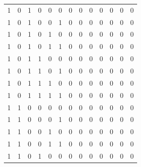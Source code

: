 \documentclass[12pt, letterpaper]{article}
\begin{document}
\begin{table}[H]
\begin{center}
\begin{tabular}{|ccc|ccc|ccc|cccc|}
    \hline
    1 & 0 & 1 & 0 & 0 & 0 & 0 & 0 & 0 & \cellcolor{ForestGreen!90}0 & \cellcolor{ForestGreen!90}0 & \cellcolor{ForestGreen!90}0 & \cellcolor{ForestGreen!90}0 \\
    1 & 0 & 1 & 0 & 0 & 1 & 0 & 0 & 0 & \cellcolor{ForestGreen!90}0 & \cellcolor{ForestGreen!90}0 & \cellcolor{ForestGreen!90}0 & \cellcolor{ForestGreen!90}0 \\
    1 & 0 & 1 & 0 & 1 & 0 & 0 & 0 & 0 & \cellcolor{ForestGreen!90}0 & \cellcolor{ForestGreen!90}0 & \cellcolor{ForestGreen!90}0 & \cellcolor{ForestGreen!90}0 \\
    1 & 0 & 1 & 0 & 1 & 1 & 0 & 0 & 0 & \cellcolor{ForestGreen!90}0 & \cellcolor{ForestGreen!90}0 & \cellcolor{ForestGreen!90}0 & \cellcolor{ForestGreen!90}0 \\
    1 & 0 & 1 & 1 & 0 & 0 & 0 & 0 & 0 & \cellcolor{ForestGreen!90}0 & \cellcolor{ForestGreen!90}0 & \cellcolor{ForestGreen!90}0 & \cellcolor{ForestGreen!90}0 \\
    1 & 0 & 1 & 1 & 0 & 1 & 0 & 0 & 0 & \cellcolor{ForestGreen!90}0 & \cellcolor{ForestGreen!90}0 & \cellcolor{ForestGreen!90}0 & \cellcolor{ForestGreen!90}0 \\
    1 & 0 & 1 & 1 & 1 & 0 & 0 & 0 & 0 & \cellcolor{ForestGreen!90}0 & \cellcolor{ForestGreen!90}0 & \cellcolor{ForestGreen!90}0 & \cellcolor{ForestGreen!90}0 \\
    1 & 0 & 1 & 1 & 1 & 1 & 0 & 0 & 0 & \cellcolor{ForestGreen!90}0 & \cellcolor{ForestGreen!90}0 & \cellcolor{ForestGreen!90}0 & \cellcolor{ForestGreen!90}0 \\
    \hline
    1 & 1 & 0 & 0 & 0 & 0 & 0 & 0 & 0 & \cellcolor{ForestGreen!90}0 & \cellcolor{ForestGreen!90}0 & \cellcolor{ForestGreen!90}0 & \cellcolor{ForestGreen!90}0 \\
    1 & 1 & 0 & 0 & 0 & 1 & 0 & 0 & 0 & \cellcolor{ForestGreen!90}0 & \cellcolor{ForestGreen!90}0 & \cellcolor{ForestGreen!90}0 & \cellcolor{ForestGreen!90}0 \\
    1 & 1 & 0 & 0 & 1 & 0 & 0 & 0 & 0 & \cellcolor{ForestGreen!90}0 & \cellcolor{ForestGreen!90}0 & \cellcolor{ForestGreen!90}0 & \cellcolor{ForestGreen!90}0 \\
    1 & 1 & 0 & 0 & 1 & 1 & 0 & 0 & 0 & \cellcolor{ForestGreen!90}0 & \cellcolor{ForestGreen!90}0 & \cellcolor{ForestGreen!90}0 & \cellcolor{ForestGreen!90}0 \\
    1 & 1 & 0 & 1 & 0 & 0 & 0 & 0 & 0 & \cellcolor{ForestGreen!90}0 & \cellcolor{ForestGreen!90}0 & \cellcolor{ForestGreen!90}0 & \cellcolor{ForestGreen!90}0 \\

\end{tabular}
\end{center}
\end{table}
\end{document}

